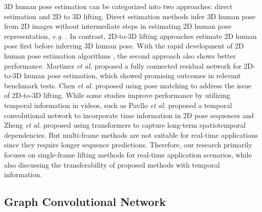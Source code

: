 \documentclass[journal]{IEEEtran}
\begin{document}
3D human pose estimation can be categorized into two approaches: direct estimation and 2D to 3D lifting. Direct estimation methods infer 3D human pose from 2D images without intermediate steps in estimating 2D human pose representation, \textit{e.g.} \cite{pavlakos2017coarse,sun2018integral,zhao2019semantic,liu2019feature}. In contrast, 2D-to-3D lifting approaches estimate 2D human pose first before inferring 3D human pose. With the rapid development of 2D human pose estimation algorithms \cite{fang2017rmpe,cao2017realtime,chen2018cascaded,sun2019deep}, the second approach also shows better performance.  Martinez \textit{et al.} \cite{martinez2017simple} proposed a fully connected residual network for 2D-to-3D human pose estimation, which showed promising outcomes in relevant benchmark tests. Chen \textit{et al.} \cite{chen20173d} proposed using pose matching to address the issue of 2D-to-3D lifting. While some studies improve performance by utilizing temporal information in videos, such as Pavllo \textit{et al.}\cite{pavllo20193d} proposed a temporal convolutional network to incorporate time information in 2D pose sequences and Zheng \textit{et al.} \cite{zheng20213d} proposed using transformers to capture long-term spatiotemporal dependencies. But multi-frame methods are not suitable for real-time applications since they require longer sequence predictions. Therefore, our research primarily focuses on single-frame lifting methods for real-time application scenarios, while also discussing the transferability of proposed methods with temporal information.



















\subsection{Graph Convolutional Network}
\end{document}
